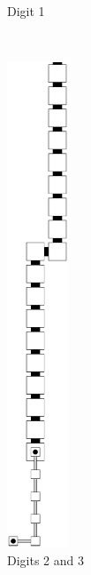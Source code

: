 \begin{enumerate}[label={--}]
\begin{figure}[h]
\begin{subfigure}[t]{0.2\textwidth}
                        \caption{\label{fig:warping/post_warp_general_digit1} Digit 1}
                    \end{subfigure}%
                    ~
                    \begin{subfigure}[t]{0.2\textwidth}
                        \centering
                        \includegraphics[width=0.2\textwidth]{warping/post_warp_general_digit2and3}
                        \caption{\label{fig:warping/post_warp_general_digit2and3} Digits 2 and 3 }
                    \end{subfigure}%
                    ~
                    \begin{subfigure}[t]{0.2\textwidth}
                        \centering

\end{subfigure}
\end{figure}
\end{enumerate}
